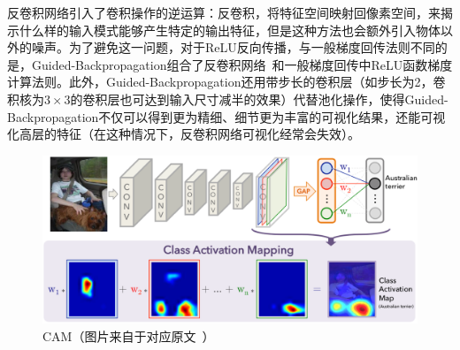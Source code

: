 反卷积网络引入了卷积操作的逆运算：反卷积，将特征空间映射回像素空间，来揭示什么样的输入模式能够产生特定的输出特征，但是这种方法也会额外引入物体以外的噪声。为了避免这一问题，对于ReLU反向传播，与一般梯度回传法则不同的是，Guided-Backpropagation组合了反卷积网络~\cite{zeiler2010deconvolutional}和一般梯度回传中ReLU函数梯度计算法则。此外，Guided-Backpropagation还用带步长的卷积层（如步长为2，卷积核为$3\times 3$的卷积层也可达到输入尺寸减半的效果）代替池化操作，使得Guided-Backpropagation不仅可以得到更为精细、细节更为丰富的可视化结果，还能可视化高层的特征（在这种情况下，反卷积网络可视化经常会失效）。
\begin{figure}[h]
	\centering
	\includegraphics[width=1.0\textwidth]{figure/cam_arichitecture}
	\caption{CAM（图片来自于对应原文~\cite{zhou2016learning}）}
	\label{fig:cam_arichitecture}
\end{figure}


